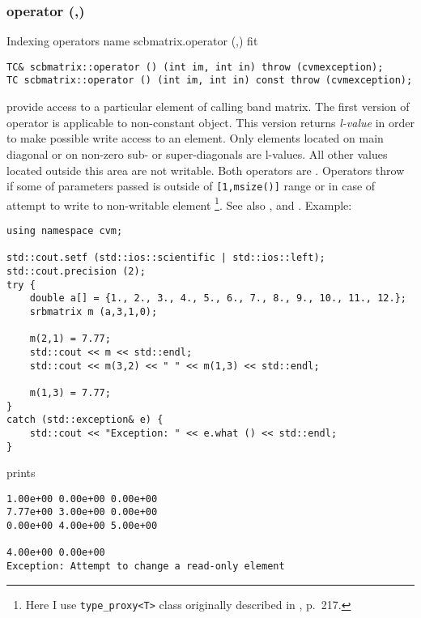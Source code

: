 \subsubsection{operator (,)}
Indexing operators%
\pdfdest name {scbmatrix.operator (,)} fit
\begin{verbatim}
TC& scbmatrix::operator () (int im, int in) throw (cvmexception);
TC scbmatrix::operator () (int im, int in) const throw (cvmexception);
\end{verbatim}
provide access to a particular element of calling band matrix. The first version
of operator is applicable to non-constant object.
This version returns  \emph{l-value}
in order to make possible write access to an element.
Only elements located on main diagonal or on non-zero
sub- or super-diagonals are l-values. All other values
located outside this area are not writable.
Both operators are \Based.
Operators throw 
if some of parameters passed
is outside of \verb"[1,msize()]" range or
in case of attempt to write to  non-writable element%
\footnote{Here I use \verb"type_proxy<T>" class originally
described in , p.~217.}.
See also ,
 and
.
Example:
\begin{Verbatim}
using namespace cvm;

std::cout.setf (std::ios::scientific | std::ios::left); 
std::cout.precision (2);
try {
    double a[] = {1., 2., 3., 4., 5., 6., 7., 8., 9., 10., 11., 12.};
    srbmatrix m (a,3,1,0);

    m(2,1) = 7.77;
    std::cout << m << std::endl;
    std::cout << m(3,2) << " " << m(1,3) << std::endl;

    m(1,3) = 7.77;
}
catch (std::exception& e) {
    std::cout << "Exception: " << e.what () << std::endl;
}
\end{Verbatim}
prints
\begin{Verbatim}
1.00e+00 0.00e+00 0.00e+00
7.77e+00 3.00e+00 0.00e+00
0.00e+00 4.00e+00 5.00e+00

4.00e+00 0.00e+00
Exception: Attempt to change a read-only element
\end{Verbatim}
\newpage




